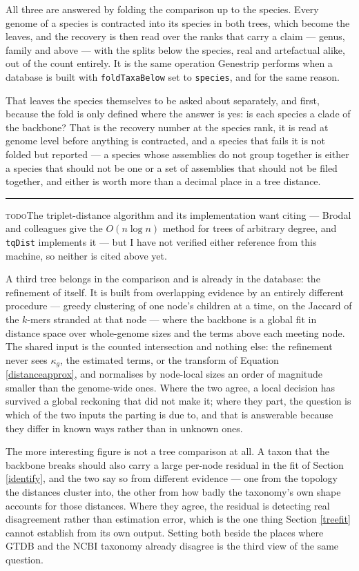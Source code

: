 \documentclass[pdflatex,sn-vancouver-num]{sn-jnl}
\newif\ifshowtodos \showtodostrue
\newcommand{\todo}[1]{%
  \ifshowtodos
    \par\addvspace{0.7\baselineskip}%
    \begin{list}{}{%
      \setlength{\leftmargin}{1.5em}%
      \setlength{\rightmargin}{1.5em}%
      \setlength{\topsep}{0pt}%
      \setlength{\partopsep}{0pt}%
      \setlength{\parsep}{0.5\baselineskip}%
      \setlength{\itemsep}{0pt}%
    }%
    \item[]\footnotesize\color{black!70}%
      \textcolor{orange!65!black}{\rule[-0.2ex]{2pt}{1.15ex}}\hspace{0.55em}%
      \textcolor{orange!65!black}{\textsc{todo}}\hspace{0.6em}\ignorespaces#1%
    \end{list}%
    \addvspace{0.7\baselineskip}%
  \fi%
}
\begin{document}
All three are answered by folding the comparison up to the species. Every genome of a species is
contracted into its species in both trees, which become the leaves, and the recovery is then read over
the ranks that carry a claim --- genus, family and above --- with the splits below the species, real
and artefactual alike, out of the count entirely. It is the same operation Genestrip performs when a
database is built with \texttt{foldTaxaBelow} set to \texttt{species}, and for the same reason.

That leaves the species themselves to be asked about separately, and first, because the fold is only
defined where the answer is yes: is each species a clade of the backbone? That is the recovery number
at the species rank, it is read at genome level before anything is contracted, and a species that
fails it is not folded but reported --- a species whose assemblies do not group together is either a
species that should not be one or a set of assemblies that should not be filed together, and either
is worth more than a decimal place in a tree distance.

\todo{The triplet-distance algorithm and its implementation want citing --- Brodal and colleagues
give the $O(n \log n)$ method for trees of arbitrary degree, and \texttt{tqDist} implements it --- but
I have not verified either reference from this machine, so neither is cited above yet.}

A third tree belongs in the comparison and is already in the database: the refinement of
\citet{genestrip-ft} itself. It is built from overlapping evidence by an entirely different procedure
--- greedy clustering of one node's children at a time, on the Jaccard of the $k$-mers stranded at
that node --- where the backbone is a global fit in distance space over whole-genome sizes and the
terms above each meeting node. The shared input is the counted intersection and nothing else: the
refinement never sees $\kappa_g$, the estimated terms, or the transform of
Equation \eqref{distanceapprox}, and normalises by node-local sizes an order of magnitude smaller
than the genome-wide ones. Where the two agree, a local decision has survived a global reckoning that
did not make it; where they part, the question is which of the two inputs the parting is due to, and
that is answerable because they differ in known ways rather than in unknown ones.

The more interesting figure is not a tree comparison at all. A taxon that the backbone breaks should
also carry a large per-node residual in the fit of Section \ref{identify}, and the two say so from
different evidence --- one from the topology the distances cluster into, the other from how badly the
taxonomy's own shape accounts for those distances. Where they agree, the residual is detecting real
disagreement rather than estimation error, which is the one thing Section \ref{treefit} cannot
establish from its own output. Setting both beside the places where GTDB and the NCBI taxonomy
already disagree is the third view of the same question.
\end{document}
